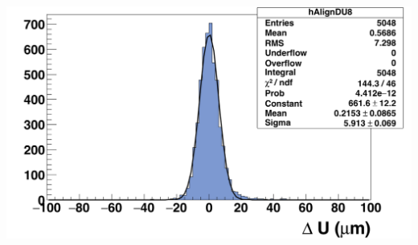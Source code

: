 \documentclass{beamer}
\begin{document}
\begin{frame}
\begin{center}
\begin{columns}[t]
\begin{column}{4cm}
        \
        \includegraphics[width = 1.2\textwidth]{Pictures/deltaU_8_corrected1.png}
      \end{column}
    \end{columns}
  \end{center}

  \vspace{-0.35cm}

  \vspace{-0.15cm}
\end{frame}
\end{document}
